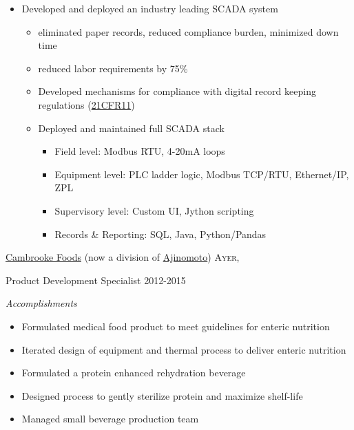 \documentclass[10pt,a4paper]{article} %
\begin{document}
{{{\begin{itemize}
\item Developed and deployed an industry leading SCADA system
	\begin{itemize}
\item eliminated paper records, reduced compliance burden, minimized down time
\item reduced labor requirements by 75\%
\item Developed mechanisms for compliance with digital record keeping regulations (\href{https://en.m.wikipedia.org/wiki/Title_21_CFR_Part_11}{21CFR11})
\item Deployed and maintained full SCADA stack
		\begin{itemize}
		\item Field level: Modbus RTU, 4-20mA loops
		\item Equipment level: PLC ladder logic, Modbus TCP/RTU, Ethernet/IP, ZPL
		\item Supervisory level: Custom UI, Jython scripting
		\item Records \& Reporting: SQL, Java, Python/Pandas
		\end{itemize}
	\end{itemize}


\end{itemize}
}
}
}
\headedsection %
{\href{http://www.cambrooke.com}{Cambrooke Foods} (now a division of \href{https://www.ajinorthamerica.com/}{Ajinomoto})}
{\textsc{Ayer, }} {

\headedsubsection %
{Product Development Specialist}
{2012-2015}
	{
\emph{Accomplishments }
\begin{itemize}
\item Formulated medical food product to meet guidelines for enteric nutrition
\item Iterated design of equipment and thermal process to deliver enteric nutrition
\item Formulated a protein enhanced rehydration beverage
\item Designed process to gently sterilize protein and maximize shelf-life
\item Managed small beverage production team
\end{itemize}
	}
}
\end{document}
